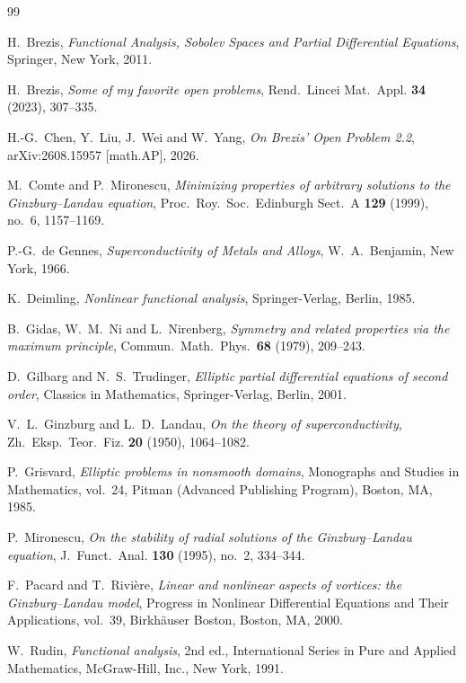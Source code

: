 \documentclass[11pt]{amsart}
\theoremstyle{definition}
\theoremstyle{plain}
\numberwithin{equation}{section}
\begin{document}
\begin{thebibliography}{99}

H.~Brezis, 
\textit{Functional Analysis, Sobolev Spaces and Partial Differential Equations}, 
Springer, New York, 2011. 

H.~Brezis, 
\textit{Some of my favorite open problems}, 
Rend.~Lincei Mat.~Appl. \textbf{34} (2023), 307--335.	 

H.-G.~Chen, Y.~Liu, J.~Wei and W.~Yang, 
\textit{On Brezis' Open Problem 2.2}, 
arXiv:2608.15957 [math.AP], 2026. 

M.~Comte and P.~Mironescu, 
\textit{Minimizing properties of arbitrary solutions to the Ginzburg--Landau equation}, 
Proc.~Roy.~Soc.~Edinburgh Sect.~A \textbf{129} (1999), no.~6, 1157--1169.

P.-G.~de Gennes, 
\textit{Superconductivity of Metals and Alloys}, 
W.~A.~Benjamin, New York, 1966. 

K.~Deimling, 
\textit{Nonlinear functional analysis}, 
Springer-Verlag, Berlin, 1985.	 

B.~Gidas, W.~M.~Ni and L.~Nirenberg, 
\textit{Symmetry and related properties via the maximum principle}, 
Commun.~Math.~Phys.~\textbf{68} (1979), 209--243. 

D.~Gilbarg and N.~S.~Trudinger, 
\textit{Elliptic partial differential equations of second order}, 
Classics in Mathematics, Springer-Verlag, Berlin, 2001. 

V.~L.~Ginzburg and L.~D.~Landau, 
\textit{On the theory of superconductivity}, 
Zh.~Eksp.~Teor.~Fiz. \textbf{20} (1950), 1064--1082. 

P.~Grisvard, 
\textit{Elliptic problems in nonsmooth domains}, 
Monographs and Studies in Mathematics, vol.~24, 
Pitman (Advanced Publishing Program), Boston, MA, 1985. 

P.~Mironescu,
\textit{On the stability of radial solutions of the Ginzburg--Landau equation},
J.~Funct.~Anal. \textbf{130} (1995), no.~2, 334--344.


F.~Pacard and T.~Rivi\`ere, 
\textit{Linear and nonlinear aspects of vortices: 
	the Ginzburg--Landau model}, 
Progress in Nonlinear Differential Equations and Their Applications, 
vol.~39, Birkh\"auser Boston, Boston, MA, 2000. 

W.~Rudin, 
\textit{Functional analysis}, 
2nd ed., International Series in Pure and Applied Mathematics, 
McGraw-Hill, Inc., New York, 1991.

\end{thebibliography}	
\end{document}

